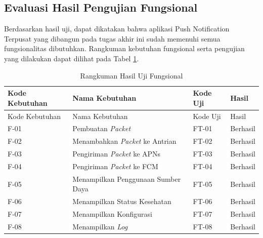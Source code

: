 \subsection{Evaluasi Hasil Pengujian Fungsional}
\par Berdasarkan hasil uji, dapat dikatakan bahwa aplikasi Push Notification Terpusat yang dibangun pada tugas akhir ini sudah memenuhi semua fungsionalitas dibutuhkan. Rangkuman kebutuhan fungsional serta pengujian yang dilakukan dapat dilihat pada Tabel \ref{t:eval_f}.
\begin{longtable}{|p{1.5cm}|p{3.5cm}|p{1.5cm}|p{1.5cm}|}
	\caption{Rangkuman Hasil Uji Fungsional} \label{t:eval_f} \\ \hline
	\rowcolor{lightgray} Kode Kebutuhan & Nama Kebutuhan & Kode Uji & Hasil \\ \hline
	\endfirsthead
	\hline
	\rowcolor{lightgray} Kode Kebutuhan & Nama Kebutuhan & Kode Uji & Hasil \\ \hline
	\endhead
	F-01 & Pembuatan \textit{Packet} & FT-01 & Berhasil \\ \hline
	F-02 & Menambahkan \textit{Packet} ke Antrian & FT-02 & Berhasil \\ \hline
	F-03 & Pengiriman \textit{Packet} ke APNs & FT-03 & Berhasil \\ \hline
	F-04 & Pengiriman \textit{Packet} ke FCM & FT-04 & Berhasil \\ \hline
	F-05 & Menampilkan Penggunaan Sumber Daya & FT-05 & Berhasil \\ \hline
	F-06 & Menampilkan Status Kesehatan & FT-06 & Berhasil \\ \hline
	F-07 & Menampilkan Konfigurasi & FT-07 & Berhasil \\ \hline
	F-08 & Menampilkan \textit{Log} & FT-08 & Berhasil \\ \hline
\end{longtable}

